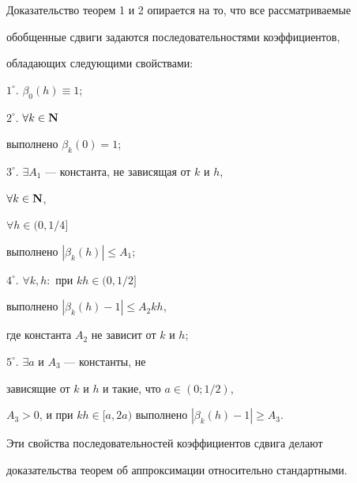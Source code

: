 Доказательство теорем 1 и 2 опирается на то, что все рассматриваемые 


обобщенные сдвиги задаются последовательностями коэффициентов, 


обладающих следующими свойствами:


\smallskip





\noindent


$1^\circ$. $\beta_0(h)\equiv1$;


\smallskip





\noindent


$2^\circ$. $\forall k\in{\bold N}$ 


выполнено $\beta_k(0) = 1$;


\smallskip





\noindent


$3^\circ$. $\exists A_1$ --- константа, не зависящая от $k$ и $h$,


$\forall k\in{\bf N}$,


$\forall h\in (0,1/4]$ 


выполнено $|\beta_k(h)|\le A_1$;


\smallskip





\noindent


$4^\circ$. $\forall k,h:$ при $kh\in (0,1/2]$ 


выполнено $|\beta_k(h)-1|\le A_2kh$,


где константа $A_2$ не зависит от $k$ и $h$;


\smallskip





\noindent


$5^\circ$. $\exists a$ и $A_3$ --- константы, не 


зависящие от $k$ и $h$ и такие, что $a\in (0;1/2)$,


$A_3 > 0$, и при $kh\in [a,2a)$ выполнено $|\beta_k(h)-1|\ge A_3$.


\medskip





\noindent Эти свойства последовательностей коэффициентов сдвига делают 


доказательства теорем об аппроксимации относительно стандартными.


